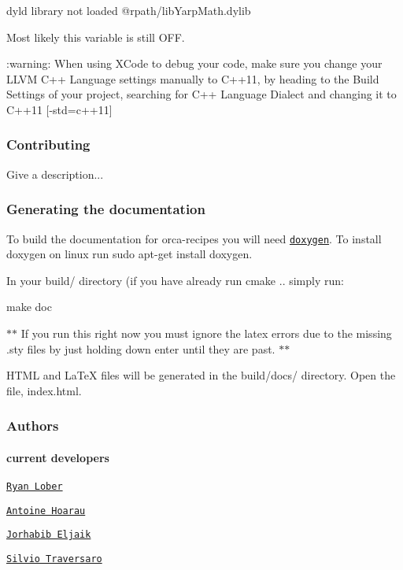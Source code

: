 \begin{DoxyCode}
dyld library not loaded @rpath/libYarpMath.dylib
\end{DoxyCode}


Most likely this variable is still {\ttfamily O\+FF}.

\+:warning\+: When using X\+Code to debug your code, make sure you change your L\+L\+VM C++ Language settings manually to C++11, by heading to the {\ttfamily Build Settings} of your project, searching for {\ttfamily C++ Language Dialect} and changing it to {\ttfamily C++11 \mbox{[}-\/std=c++11\mbox{]}}

\subsubsection*{Contributing}

Give a description...

\subsubsection*{Generating the documentation}

To build the documentation for {\ttfamily orca-\/recipes} you will need \href{http://www.stack.nl/~dimitri/doxygen/index.html}{\tt {\ttfamily doxygen}}. To install {\ttfamily doxygen} on linux run {\ttfamily sudo apt-\/get install doxygen}.

In your {\ttfamily build/} directory (if you have already run {\ttfamily cmake ..} simply run\+: 
\begin{DoxyCode}
make doc
\end{DoxyCode}
 $\ast$$\ast$ If you run this right now you must ignore the latex errors due to the missing {\ttfamily .sty} files by just holding down {\ttfamily enter} until they are past. $\ast$$\ast$

H\+T\+ML and La\+TeX files will be generated in the {\ttfamily build/docs/} directory. Open the file, {\ttfamily index.\+html}.

\subsubsection*{Authors}

\paragraph*{current developers}


\begin{DoxyItemize}
\item \href{https://github.com/rlober}{\tt Ryan Lober}
\item \href{https://github.com/ahoarau}{\tt Antoine Hoarau}
\item \href{https://github.com/jeljaik}{\tt Jorhabib Eljaik}
\item \href{https://github.com/traversaro}{\tt Silvio Traversaro}
\end{DoxyItemize}

